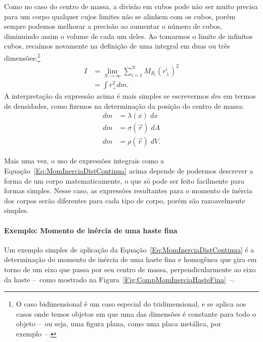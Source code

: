 Como no caso do centro de massa, a divisão em cubos pode não ser muito precisa para um corpo qualquer cujos limites não se alinhem com os cubos, porém sempre podemos melhorar a precisão ao aumentar o número de cubos, diminuindo assim o volume de cada um deles. Ao tomarmos o limite de infinitos cubos, recaímos novamente na definição de uma integral em duas ou três dimensões:\footnote[][3cm]{O caso bidimensional é um caso especial do tridimensional, e se aplica aos casos onde temos objetos em que uma das dimensões é constante para todo o objeto --~ou seja, uma figura plana, como uma placa metálica, por exemplo~--.}
\begin{align}
    I &= \lim_{N \to \infty} \sum_{i = 1}^N M_{R_i} (r_\perp^i)^2 \\
    &= \int r_\perp^2 dm. \label{Eq:MomInerciaDistContinua}
\end{align}
%
A interpretação da expressão acima é mais simples se escrevermos $dm$ em termos de densidades, como fizemos na determinação da posição do centro de massa:
\begin{align}
    dm &= \lambda(x) \; dx \\
    dm &= \sigma(\vec{r}) \;dA \\
    dm &= \rho(\vec{r}) \; dV.
\end{align}

Mais uma vez, o uso de expressões integrais como a Equação~\eqref{Eq:MomInerciaDistContinua} acima depende de podermos descrever a forma de um corpo matematicamente, o que só pode ser feito facilmente para formas simples. Nesse caso, as expressões resultantes para o momento de inércia dos corpos serão diferentes para cada tipo de corpo, porém são razoavelmente simples.

\paragraph{Exemplo: Momento de inércia de uma haste fina}

Um exemplo simples de aplicação da Equação~\eqref{Eq:MomInerciaDistContinua} é a determinação do momento de inércia de uma haste fina  e homogênea que gira em torno de um eixo que passa por seu centro de massa, perpendicularmente ao eixo da haste --~como mostrado na Figura~\ref{Fig:CompMomInerciaHasteFina}~--.

